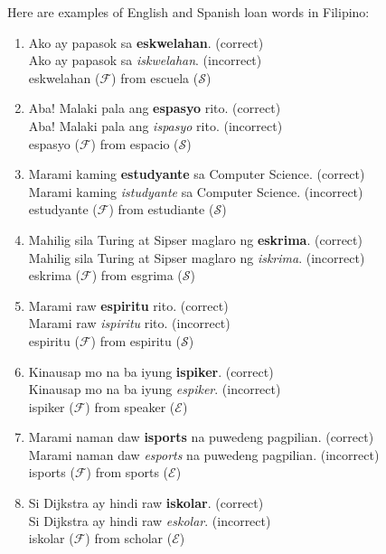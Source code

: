 \begin{example}
    Here are examples of English and Spanish loan words in Filipino:
\end{example}
\begin{enumerate}
    \item Ako ay papasok sa \textbf{eskwelahan}. (correct) \\
          Ako ay papasok sa \textit{iskwelahan}. (incorrect) \\
          eskwelahan (\(\mathcal{F}\)) from escuela (\(\mathcal{S}\))
    \item Aba! Malaki pala ang \textbf{espasyo} rito. (correct) \\
          Aba! Malaki pala ang \textit{ispasyo} rito. (incorrect) \\
          espasyo (\(\mathcal{F}\)) from espacio (\(\mathcal{S}\))
    \item Marami kaming \textbf{estudyante} sa Computer Science. (correct) \\
          Marami kaming \textit{istudyante} sa Computer Science. (incorrect)\\
          estudyante (\(\mathcal{F}\)) from estudiante (\(\mathcal{S}\))
    \item Mahilig sila Turing at Sipser maglaro ng \textbf{eskrima}. (correct) \\
          Mahilig sila Turing at Sipser maglaro ng \textit{iskrima}. (incorrect) \\
          eskrima  (\(\mathcal{F}\)) from esgrima (\(\mathcal{S}\))
    \item Marami raw \textbf{espiritu} rito. (correct) \\
          Marami raw \textit{ispiritu} rito. (incorrect) \\
          espiritu (\(\mathcal{F}\)) from espiritu (\(\mathcal{S}\))
    \item Kinausap mo na ba iyung \textbf{ispiker}. (correct) \\
          Kinausap mo na ba iyung \textit{espiker}. (incorrect) \\
          ispiker (\(\mathcal{F}\)) from speaker (\(\mathcal{E}\))
    \item Marami naman daw \textbf{isports} na puwedeng pagpilian. (correct) \\
          Marami naman daw \textit{esports} na puwedeng pagpilian. (incorrect) \\
          isports (\(\mathcal{F}\)) from sports (\(\mathcal{E}\))
    \item Si Dijkstra ay hindi raw \textbf{iskolar}. (correct) \\
          Si Dijkstra ay hindi raw \textit{eskolar}. (incorrect) \\
          iskolar (\(\mathcal{F}\)) from scholar (\(\mathcal{E}\))
\end{enumerate}

